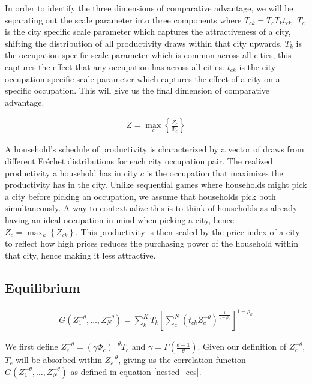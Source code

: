 \documentclass[10pt]{article}
\begin{document}
In order to identify the three dimensions of comparative advantage, we will be separating out the scale parameter into three components where $T_{ck} = T_c T_k t_{ck}$. $T_c$ is the city specific scale parameter which captures the attractiveness of a city, shifting the distribution of all productivity draws within that city upwards. $T_k$ is the occupation specific scale parameter which is common across all cities, this captures the effect that any occupation has across all cities. $t_{ck}$ is the city-occupation specific scale parameter which captures the effect of a city on a specific occupation. This will give us the final dimension of comparative advantage.

\begin{align}
    Z = \max_c \left\{ \frac{Z_c}{\Phi_c} \right\}
\end{align}

A household's schedule of productivity is characterized by a vector of draws from different Fr\'{e}chet distributions for each city occupation pair. The realized productivity a household has in city $c$ is the occupation that maximizes the productivity has in the city. Unlike sequential games where households might pick a city before picking an occupation, we assume that households pick both simultaneously. A way to contextualize this is to think of households as already having an ideal occupation in mind when picking a city, hence $Z_c = \max_k \left\{ Z_{ck} \right\}$. This productivity is then scaled by the price index of a city to reflect how high prices reduces the purchasing power of the household within that city, hence making it less attractive.

\subsection{Equilibrium}

\begin{align}
    G(Z_1^{- \theta}, \dots, Z_N^{- \theta}) = \sum_{k}^{K} T_k \left[ \sum_{c}^{N} (t_{ck} Z_c^{- \theta})^{\frac{1}{1 - \rho_k}} \right]^{1 - \rho_k}
    \label{nested_ces}
\end{align}

We first define $Z_c^{- \theta} = (\gamma \Phi_c)^{- \theta} T_c$ and $\gamma = \Gamma (\frac{\theta - 1}{\theta})$. Given our definition of $Z_c^{- \theta}$, $T_c$ will be absorbed within $Z_c^{- \theta}$, giving us the correlation function $G(Z_1^{- \theta}, \dots, Z_N^{- \theta})$ as defined in equation \ref{nested_ces}.
\end{document}
